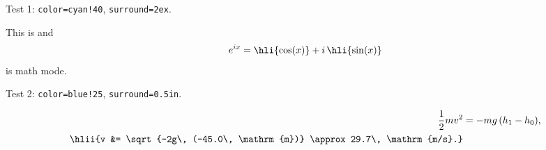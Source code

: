 \documentclass{article}
\begin{document}
\newhighlight{}
Test 1: \verb|color=cyan!40|, \verb|surround=2ex|.

This is  and
\[
  e^{ix} = \hli{\cos(x)} + i\, \hli{\sin(x)}
\]
is math mode.

\newAhighlight{}
Test 2: \verb|color=blue!25|, \verb|surround=0.5in|.

\begin{align*}
  \frac{1}{2} mv^2 &= -mg\, (h_1 - h_0), \\
  \hlii{v &= \sqrt{-2g\, (-45.0\, \mathrm{m})}
    \approx 29.7\, \mathrm{m/s}.}
\end{align*}
\end{document}
